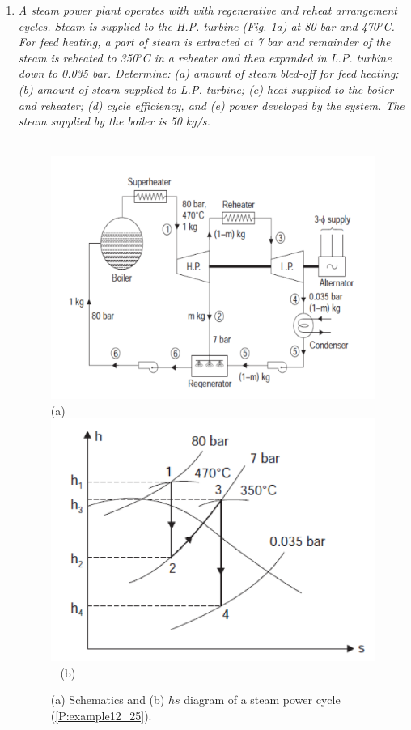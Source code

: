 \documentclass[12pts,a4paper,amsmath,amssymb,floatfix]{article}%
\begin{document}
\begin{enumerate}[label=\bfseries Problem \arabic*]
\item\label{P:example12_25} {\it A steam power plant operates with with regenerative and reheat arrangement cycles. Steam is supplied to the H.P. turbine (Fig. \ref{example12_25}a) at 80 bar and 470$^{o}$C.  For feed heating, a part of steam is extracted at 7 bar and remainder of the steam is reheated to 350$^{o}$C in a reheater and then expanded in L.P. turbine down to 0.035 bar. Determine: (a) amount of steam bled-off for feed heating; (b) amount of steam supplied to L.P. turbine; (c) heat supplied to the boiler and reheater; (d) cycle efficiency, and (e) power developed by the system. The steam supplied by the boiler is 50 kg/s.}
   \begin{figure}[h]
    \begin{center}
    \vbox{
     \hbox{\hspace{1cm}
      \includegraphics[width=12.cm,clip]{./Pics/Exemple12_25a_Rajput}}
     \hbox{\hspace{7.5cm}(a)}
     \hbox{\hspace{1.cm}
      \includegraphics[width=12.cm,clip]{./Pics/Exemple12_25b_Rajput}
      }
     \hbox{\hspace{7.5cm}(b)}}
     \caption{ (a) Schematics and (b) $hs$ diagram of a steam power cycle (\ref{P:example12_25}).}
     \label{example12_25}
     \end{center}
   \end{figure}
 


\end{enumerate}
\end{document}
